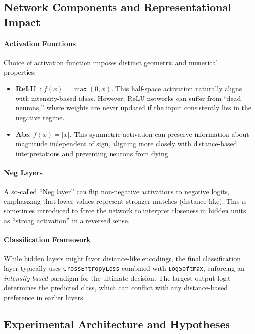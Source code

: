\documentclass{article}
\begin{document}
\subsection{Network Components and Representational Impact}

\paragraph{Activation Functions}
Choice of activation function imposes distinct geometric and numerical properties:
\begin{itemize}
    \item \textbf{ReLU}~\cite{nair2010rectified}: $f(x) = \max(0, x)$. This half-space activation naturally aligns with intensity-based ideas. However, ReLU networks can suffer from ``dead neurons,'' where weights are never updated if the input consistently lies in the negative regime.
    \item \textbf{Abs}: $f(x) = |x|$. This symmetric activation can preserve information about magnitude independent of sign, aligning more closely with distance-based interpretations and preventing neurons from dying.
\end{itemize}

\paragraph{Neg Layers}
A so-called ``Neg layer'' can flip non-negative activations to negative logits, emphasizing that lower values represent stronger matches (distance-like). This is sometimes introduced to force the network to interpret closeness in hidden units as ``strong activation'' in a reversed sense.

\paragraph{Classification Framework}
While hidden layers might favor distance-like encodings, the final classification layer typically uses \texttt{CrossEntropyLoss} combined with \texttt{LogSoftmax}, enforcing an \emph{intensity-based} paradigm for the ultimate decision. The largest output logit determines the predicted class, which can conflict with any distance-based preference in earlier layers.

\subsection{Experimental Architecture and Hypotheses}
\end{document}
